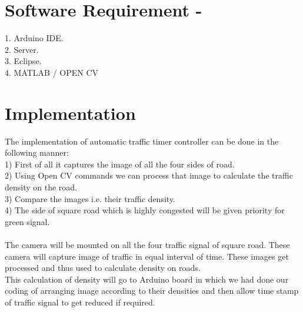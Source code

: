 \documentclass[]{article}
\begin{document}
\section*{Software Requirement - }
1. Arduino IDE.
\\
2. Server.
\\
3. Eclipse.
\\
4. MATLAB / OPEN CV


\section*{Implementation}
The implementation of automatic traffic timer controller can be done in the following manner:
\\
1) First of all it captures the image of all the four sides of road.
\\
2) Using Open CV commands we can process that image to calculate the traffic density on the road.
\\
3) Compare the images i.e. their traffic density.
\\
4) The side of square road which is highly congested will be given priority for green signal.
\\
\\
The camera will be mounted on all the four traffic signal of square road. These camera will capture image of traffic in equal interval of time. These images get processed and thus used to calculate density on roads. 
\\
This calculation of density will go to Arduino board in which we had done our coding of arranging image according to their densities and then allow time stamp of traffic signal to get reduced if required.
\end{document}
